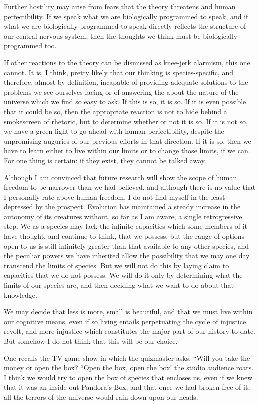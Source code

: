 Further hostility may arise from fears that the theory threatens  and human perfectibility. If we speak what we are biologically programmed to speak, and if what we are biologically programmed to speak directly reflects the structure of our central nervous system, then the thoughts we think must be biologically programmed too.

If other reactions to the theory can be dismissed as knee-jerk alarmism, this one cannot. It is, I think, pretty likely that our thinking is species-specific, and therefore, almost by definition, incapable of providing adequate solutions to the problems we see ourselves facing or of answering the  about the nature of the universe which we find so easy to ask. If this is so, it is so. If it is even possible that it could be so, then the appropriate reaction is not to hide behind a smokescreen of rhetoric, but to determine whether or not it is so. If it is not so, we have a green light to go ahead with human perfectibility, despite the unpromising auguries of our previous efforts in that direction. If it is so, then we have to learn either to live within our limits or to change those limits, if we can. For one thing is certain: if they exist, they cannot be talked away.

Although I am convinced that future research will show the scope of human freedom to be narrower than we had believed, and although there is no value that I personally rate above human freedom, I do not find myself in the least depressed by the prospect. Evolution has maintained a steady increase in the autonomy of its creatures without, so far as I am aware, a single retrogressive step. We as a species may lack the infinite capacities which some members of it have thought,
and continue to think, that we possess, but the range of options open to us is still infinitely greater than that available to any other species, and the peculiar powers we have inherited allow the possibility that we may one day transcend the limits of species. But we will not do this by laying claim to capacities that we do not possess. We will do it only by determining what the limits of our species are, and then deciding what we want to do about that knowledge.

We may decide that less is more, small is beautiful, and that we must live within our cognitive means, even if so living entails perpetuating the cycle of injustice, revolt, and more injustice which constitutes the major part of our history to date. But somehow I do not think that this will be our choice.
 
One recalls the TV game show in which the quizmaster asks, ``Will you take the money or open the box? ``Open the box, open the box! the studio audience roars. I think we would try to open the box of species that encloses us, even if we knew that it was an inside-out Pandora's Box, and that once we had broken free of it, all the terrors of the universe would rain down upon our heads.